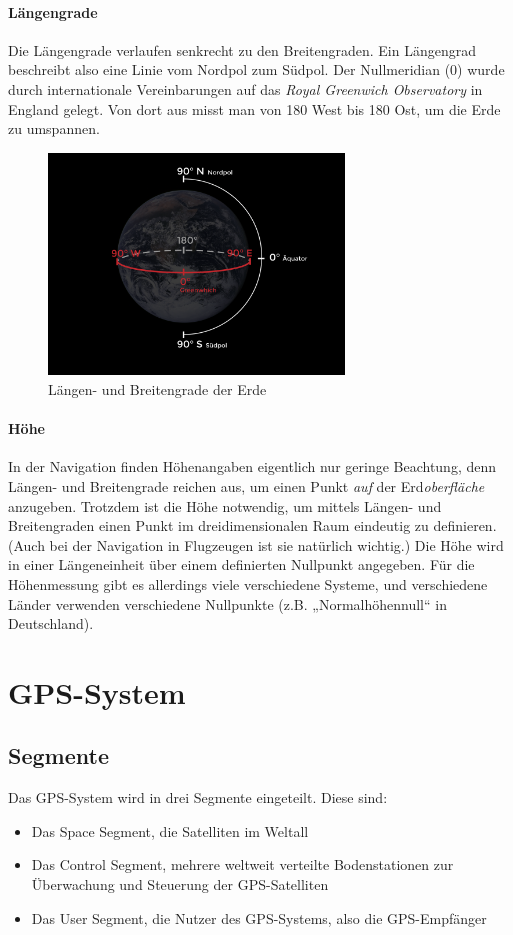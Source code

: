 \documentclass[12pt,a4paper]{scrartcl}
\begin{document}
\paragraph{Längengrade}
Die Längengrade verlaufen senkrecht zu den Breitengraden. Ein Längengrad beschreibt also eine Linie vom Nordpol zum Südpol. Der Nullmeridian (0\degree{}) wurde durch internationale Vereinbarungen auf das \emph{Royal Greenwich Observatory} in England gelegt. Von dort aus misst man von 180\degree{} West bis 180\degree{} Ost, um die Erde zu umspannen.

\begin{figure}
\centering
\includegraphics[width=0.7\textwidth]{img/latlong-01.png}
\caption{Längen- und Breitengrade der Erde}
\end{figure}

\paragraph{Höhe}
In der Navigation finden Höhenangaben eigentlich nur geringe Beachtung, denn Längen- und Breitengrade reichen aus, um einen Punkt \emph{auf} der Erd\emph{oberfläche} anzugeben. Trotzdem ist die Höhe notwendig, um mittels Längen- und Breitengraden einen Punkt im dreidimensionalen Raum eindeutig zu definieren. (Auch bei der Navigation in Flugzeugen ist sie natürlich wichtig.) Die Höhe wird in einer Längeneinheit über einem definierten Nullpunkt angegeben. Für die Höhenmessung gibt es allerdings viele verschiedene Systeme, und verschiedene Länder verwenden verschiedene Nullpunkte (z.B. „Normalhöhennull“ in Deutschland).

\section{GPS-System}

\subsection{Segmente}
Das GPS-System wird in drei Segmente eingeteilt. Diese sind:
\begin{itemize}
\item Das Space Segment, die Satelliten im Weltall
\item Das Control Segment, mehrere weltweit verteilte Bodenstationen zur Überwachung und Steuerung der GPS-Satelliten
\item Das User Segment, die Nutzer des GPS-Systems, also die GPS-Empfänger
\end{itemize}
\cite{gpsgov_segments}
\end{document}
